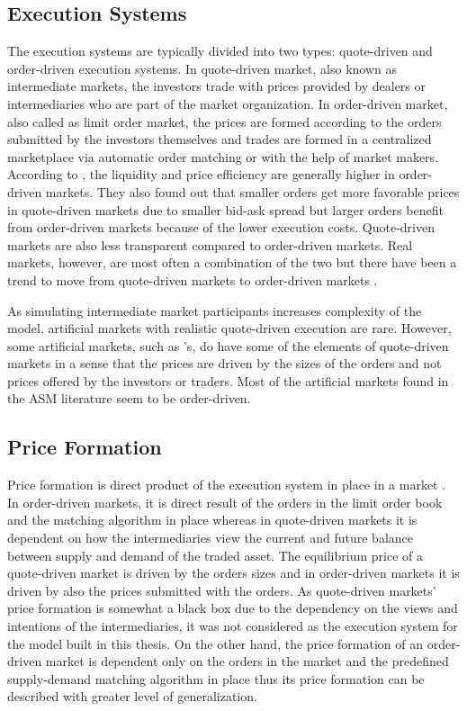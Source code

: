 \subsection{Execution Systems}
The execution systems are typically divided into two types:
quote-driven and order-driven execution systems. In quote-driven market, also known
as intermediate markets, the investors trade with prices provided 
by dealers or intermediaries who are part of the market organization. 
In order-driven market, also called as limit order market, 
the prices are formed according to the orders submitted by the 
investors themselves and trades are formed in a centralized marketplace 
via automatic order matching or with the help of market makers. 
\citep{Baru17} According to \citet{MALINOVA2013104},
the liquidity and price efficiency are generally higher in order-driven 
markets. They also found out that smaller orders get more favorable prices in 
quote-driven markets due to smaller bid-ask spread 
but larger orders benefit from order-driven markets because of the lower 
execution costs. Quote-driven markets are also less transparent compared
to order-driven markets. Real markets, however, are most often a combination
of the two \citep{boer05} but there have been a trend to move from quote-driven
markets to order-driven markets \citep{MALINOVA2013104}.

As simulating intermediate market participants increases complexity
of the model, artificial markets with realistic quote-driven execution are rare. 
However, some artificial markets, such as \citet{SantaFe99}'s, do have some of 
the elements of quote-driven markets in a sense that the prices are driven by 
the sizes of the orders and not prices offered by the investors or traders. 
Most of the artificial markets found in the ASM literature seem to be order-driven.

\subsection{Price Formation}
Price formation is direct product of the execution system in place in a market
\citep{boer05}. In order-driven markets, it is direct result of the orders
in the limit order book and the matching algorithm in place whereas in quote-driven markets it
is dependent on how the intermediaries view the current and future 
balance between supply and demand of the traded asset. The equilibrium price of a 
quote-driven market is driven by the orders sizes and in order-driven markets
it is driven by also the prices submitted with the orders. \citep{MALINOVA2013104}
As quote-driven markets' price formation is somewhat a black box due to the 
dependency on the views and intentions of the intermediaries, it was not considered
as the execution system for the model built in this thesis. On the other hand, 
the price formation of an order-driven market is dependent only on the orders in the
market and the predefined supply-demand matching algorithm in place thus its price 
formation can be described with greater level of generalization.

